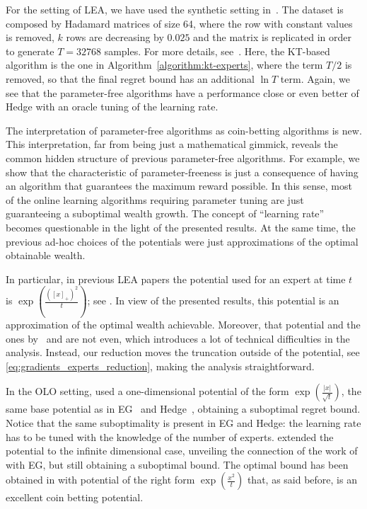 For the setting of \ac{LEA}, we have used the synthetic setting in~\cite{Chaudhuri-Freund-Hsu-2009}. The dataset is composed by Hadamard matrices of size 64, where the row with constant values is removed, $k$ rows are decreasing by $0.025$ and the matrix is replicated in order to generate $T=32768$ samples. For more details, see~\cite{Chaudhuri-Freund-Hsu-2009}. Here, the KT-based algorithm is the one in Algorithm~\ref{algorithm:kt-experts}, where the term $T/2$ is removed, so that the final regret bound has an additional $\ln T$ term.
Again, we see that the parameter-free algorithms have a performance close or even better of Hedge with an oracle tuning of the learning rate.


The interpretation of parameter-free algorithms as coin-betting algorithms is
new. This interpretation, far from being just a mathematical gimmick, reveals
the common hidden structure of previous parameter-free algorithms. For example,
we show that the characteristic of parameter-freeness is just a
consequence of having an algorithm that guarantees the maximum reward possible.
In this sense, most of the online learning algorithms requiring parameter tuning
are just guaranteeing a suboptimal wealth growth. The concept of
``learning rate'' becomes questionable in the light of the presented results.
At the same time, the previous ad-hoc choices of the potentials were just
approximations of the optimal obtainable wealth.

In particular, in previous \ac{LEA} papers the potential used for an expert at
time $t$ is $\exp \left(\tfrac{([x]_+)^2}{t} \right)$; see \citep{Chaudhuri-Freund-Hsu-2009,
Luo-Schapire-2014, Luo-Schapire-2015}. In view of the presented results, this potential 
is an approximation of the optimal wealth achievable. Moreover, that potential and the ones by~\citet{Chernov-Vovk-2010}
and \cite{Koolen-van-Erven-2015} are not even, which introduces a lot of
technical difficulties in the analysis. Instead, our reduction moves the
truncation outside of the potential, see \eqref{eq:gradients_experts_reduction}, making the analysis straightforward.

In the \ac{OLO} setting, \citet{Streeter-McMahan-2012} used a one-dimensional
potential of the form $\exp \left(\tfrac{|x|}{\sqrt{t}}\right)$, the same base
potential as in \ac{EG}~\citep{Kivinen-Warmuth-1997} and Hedge~\cite{Freund-Schapire-1997}, obtaining a suboptimal
regret bound. Notice that the same suboptimality is present in \ac{EG} and Hedge: the learning rate has to be tuned with the
knowledge of the number of experts.
\citet{Orabona-2013} extended the potential to the infinite dimensional case, unveiling the connection of the work of \citet{Streeter-McMahan-2012} with \ac{EG}, but still obtaining a suboptimal bound. The optimal bound has been obtained in
\citet{McMahan-Orabona-2014} with potential of the right form $\exp
\left(\frac{x^2}{t}\right)$ that, as said before, is an excellent coin betting potential.

